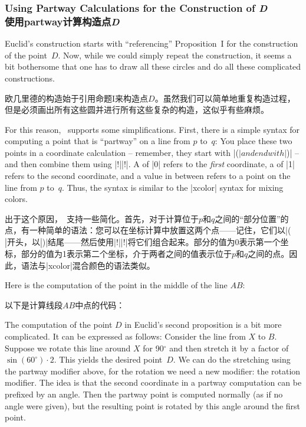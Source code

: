 \subsubsection{Using Partway Calculations for the Construction of \emph{D}\\使用partway计算构造点\emph{D}}

Euclid's construction starts with ``referencing'' Proposition~I for the
construction of the point~$D$. Now, while we could simply repeat the
construction, it seems a bit bothersome that one has to draw all these circles
and do all these complicated constructions.

欧几里德的构造始于引用命题I来构造点$D$。虽然我们可以简单地重复构造过程，但是必须画出所有这些圆并进行所有这些复杂的构造，这似乎有些麻烦。

For this reason, \tikzname\ supports some simplifications. First, there is a
simple syntax for computing a point that is ``partway'' on a line from $p$
to~$q$: You place these two points in a coordinate calculation -- remember,
they start with |($| and end with |$)| -- and then combine them using
|!||!|. A  of |0| refers to the \emph{first} coordinate,
a  of |1| refers to the second coordinate, and a value in between
refers to a point on the line from $p$ to~$q$. Thus, the syntax is similar to
the |xcolor| syntax for mixing colors.

出于这个原因，\tikzname\ 支持一些简化。首先，对于计算位于$p$和$q$之间的“部分位置”的点，有一种简单的语法：您可以在坐标计算中放置这两个点——记住，它们以|($|开头，以|$)|结尾——然后使用|!||!|将它们组合起来。部分的值为0表示第一个坐标，部分的值为1表示第二个坐标，介于两者之间的值表示位于$p$和$q$之间的点。因此，语法与|xcolor|混合颜色的语法类似。


Here is the computation of the point in the middle of the line $AB$:

以下是计算线段$AB$中点的代码：
%
\begin{codeexample}[preamble={\usetikzlibrary{calc}}]
\end{codeexample}

The computation of the point $D$ in Euclid's second proposition is a bit more
complicated. It can be expressed as follows: Consider the line from $X$ to $B$.
Suppose we rotate this line around $X$ for 90$^\circ$ and then stretch it by a
factor of $\sin(60^\circ) \cdot 2$. This yields the desired point~$D$. We can
do the stretching using the partway modifier above, for the rotation we need a
new modifier: the rotation modifier. The idea is that the second coordinate in
a partway computation can be prefixed by an angle. Then the partway point is
computed normally (as if no angle were given), but the resulting point is
rotated by this angle around the first point.
%

